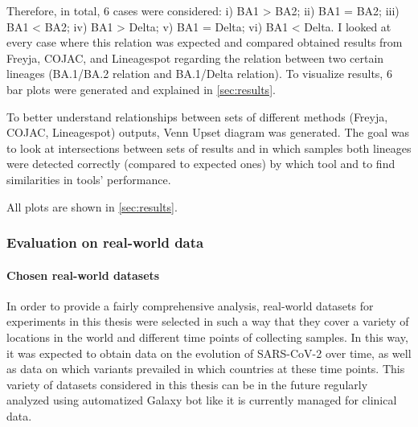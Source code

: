                 Therefore, in total, 6 cases were considered: i) BA1 > BA2; ii) BA1 = BA2; iii) BA1 < BA2; iv) BA1 > Delta;  v) BA1 = Delta;  vi) BA1 < Delta. 
                I looked at every case where this relation was expected and compared obtained results from Freyja, COJAC, and Lineagespot regarding the relation between two certain lineages (BA.1/BA.2 relation and BA.1/Delta relation). To visualize results, 6 bar plots were generated and explained in \cref{sec:results}.
                
                To better understand relationships between sets of different methods (Freyja, COJAC, Lineagespot) outputs, Venn Upset diagram was generated. The goal was to look at intersections between sets of results and in which samples both lineages were detected correctly (compared to expected ones) by which tool and to find similarities in tools' performance.
                
                All plots are shown in \cref{sec:results}.

        
        \subsubsection{Evaluation on real-world data} \label{sec:methods:evaluation:real}
        
            \paragraph{Chosen real-world datasets} 
            In order to provide a fairly comprehensive analysis, real-world datasets for experiments in this thesis were selected in such a way that they cover a variety of locations in the world and different time points of collecting samples. In this way, it was expected to obtain data on the evolution of SARS-CoV-2 over time, as well as data on which variants prevailed in which countries at these time points. This variety of datasets considered in this thesis can be in the future regularly analyzed using automatized Galaxy bot like it is currently managed for clinical data. 

